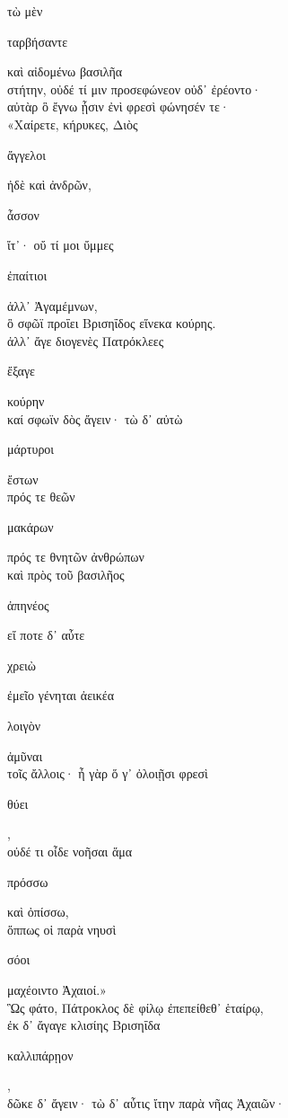 \documentclass{ransom}
\begin{document}
\renewcommand{\rightheaderwhat}{\rightheaderwhatglosses}%
\begin{foreignpage}
\begin{graytext}
τὼ μὲν \begin{whitetext}ταρβήσαντε\end{whitetext} καὶ αἰδομένω βασιλῆα\\
στήτην, οὐδέ τί μιν προσεφώνεον οὐδ᾽ ἐρέοντο·\\
αὐτὰρ ὃ ἔγνω ᾗσιν ἐνὶ φρεσὶ φώνησέν τε·\\
«Χαίρετε, κήρυκες, Διὸς \begin{whitetext}ἄγγελοι\end{whitetext} ἠδὲ καὶ ἀνδρῶν,\\
\begin{whitetext}ἆσσον\end{whitetext} ἴτ᾽· οὔ τί μοι ὔμμες \begin{whitetext}ἐπαίτιοι\end{whitetext} ἀλλ᾽ Ἀγαμέμνων,\hfill{}\\
ὃ σφῶϊ προΐει Βρισηΐδος εἵνεκα κούρης.\\
ἀλλ᾽ ἄγε διογενὲς Πατρόκλεες \begin{whitetext}ἔξαγε\end{whitetext} κούρην\\
καί σφωϊν δὸς ἄγειν· τὼ δ᾽ αὐτὼ \begin{whitetext}μάρτυροι\end{whitetext} ἔστων\\
πρός τε θεῶν \begin{whitetext}μακάρων\end{whitetext} πρός τε θνητῶν ἀνθρώπων\\
καὶ πρὸς τοῦ βασιλῆος \begin{whitetext}ἀπηνέος\end{whitetext} εἴ ποτε δ᾽ αὖτε\hfill{}\\
\begin{whitetext}χρειὼ\end{whitetext} ἐμεῖο γένηται ἀεικέα \begin{whitetext}λοιγὸν\end{whitetext} ἀμῦναι\\
τοῖς ἄλλοις· ἦ γὰρ ὅ γ᾽ ὀλοιῇσι φρεσὶ \begin{whitetext}θύει\end{whitetext},\\
οὐδέ τι οἶδε νοῆσαι ἅμα \begin{whitetext}πρόσσω\end{whitetext} καὶ ὀπίσσω,\\
ὅππως οἱ παρὰ νηυσὶ \begin{whitetext}σόοι\end{whitetext} μαχέοιντο Ἀχαιοί.»\\
Ὣς φάτο, Πάτροκλος δὲ φίλῳ ἐπεπείθεθ᾽ ἑταίρῳ,\hfill{}\\
ἐκ δ᾽ ἄγαγε κλισίης Βρισηΐδα \begin{whitetext}καλλιπάρῃον\end{whitetext},\\
δῶκε δ᾽ ἄγειν· τὼ δ᾽ αὖτις ἴτην παρὰ νῆας Ἀχαιῶν·\\


\end{graytext}
\end{foreignpage}
\end{document}
